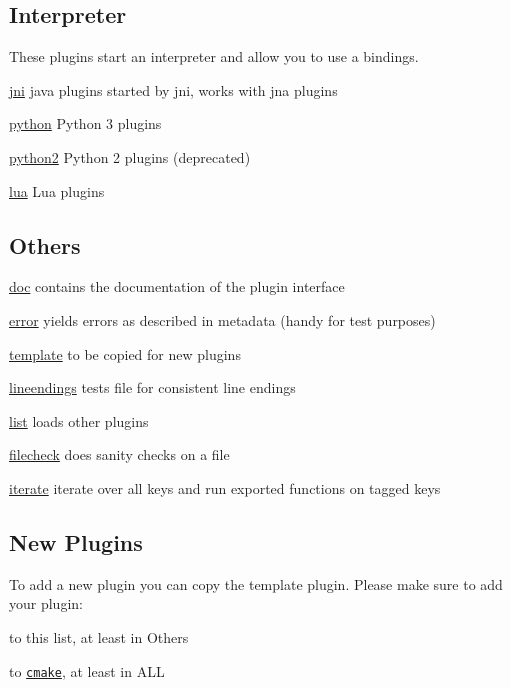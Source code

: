 \subsection*{Interpreter}

These plugins start an interpreter and allow you to use a bindings.


\begin{DoxyItemize}
\item \hyperlink{md_src_plugins_jni_README_src_plugins_jni_README_md}{jni} java plugins started by jni, works with jna plugins
\item \hyperlink{md_src_plugins_python_README_src_plugins_python_README_md}{python} Python 3 plugins
\item \hyperlink{md_src_plugins_python2_README_src_plugins_python2_README_md}{python2} Python 2 plugins (deprecated)
\item \hyperlink{md_src_plugins_lua_README_src_plugins_lua_README_md}{lua} Lua plugins
\end{DoxyItemize}

\subsection*{Others}


\begin{DoxyItemize}
\item \hyperlink{md_src_plugins_doc_README_src_plugins_doc_README_md}{doc} contains the documentation of the plugin interface
\item \hyperlink{md_src_plugins_error_README_src_plugins_error_README_md}{error} yields errors as described in metadata (handy for test purposes)
\item \hyperlink{md_src_plugins_template_README_src_plugins_template_README_md}{template} to be copied for new plugins
\item \hyperlink{md_src_plugins_lineendings_README_src_plugins_lineendings_README_md}{lineendings} tests file for consistent line endings
\item \hyperlink{md_src_plugins_list_README_src_plugins_list_README_md}{list} loads other plugins
\item \hyperlink{md_src_plugins_filecheck_README_src_plugins_filecheck_README_md}{filecheck} does sanity checks on a file
\item \hyperlink{md_src_plugins_iterate_README_src_plugins_iterate_README_md}{iterate} iterate over all keys and run exported functions on tagged keys
\end{DoxyItemize}

\subsection*{New Plugins}

To add a new plugin you can copy the template plugin. Please make sure to add your plugin\+:


\begin{DoxyItemize}
\item to this list, at least in Others
\item to \href{/home/markus/Projekte/Elektra/current/cmake/ElektraCache.cmake}{\tt cmake}, at least in A\+L\+L 
\end{DoxyItemize}